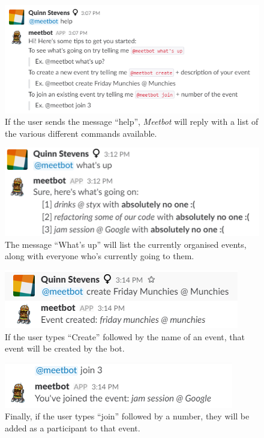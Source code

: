 \documentclass[12pt]{report}
\begin{document}
\begin{figure}[H]
\caption{If the user sends the message ``help'', \emph{Meetbot} will reply with a list of the various different commands available.}
\includegraphics{help}
\end{figure}

\begin{figure}[H]
\caption{The message ``What's up'' will list the currently organised events, along with everyone who's currently going to them.}
\includegraphics{whatsup}
\end{figure}

\begin{figure}[H]
\caption{If the user types ``Create'' followed by the name of an event, that event will be created by the bot.}
\includegraphics{create}
\end{figure}

\begin{figure}[H]
\caption{Finally, if the user types ``join'' followed by a number, they will be added as a participant to that event.}
\includegraphics{join}
\end{figure}
\end{document}
